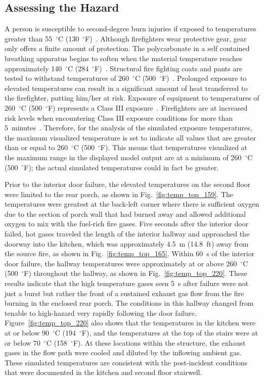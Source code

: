 \subsection{Assessing the Hazard}
\label{hazard}
A person is susceptible to second-degree burn injuries if exposed to temperatures greater than 55~$^{\circ}$C (130~$^{\circ}$F)~\cite{contactburn}. Although firefighters wear protective gear, gear only offers a finite amount of protection. The polycarbonate in a self contained breathing apparatus begins to soften when the material temperature reaches approximately 140~$^{\circ}$C (284~$^{\circ}$F)~\cite{mensch2011emergency}. Structural fire fighting coats and pants are tested to withstand temperatures of 260~$^{\circ}$C (500~$^{\circ}$F)~\cite{nfpa2013standard}. Prolonged exposure to elevated temperatures can result in a significant amount of heat transferred to the firefighter, putting him/her at risk. Exposure of equipment to temperatures of 260~$^{\circ}$C (500~$^{\circ}$F) represents a Class III exposure~\cite{Donnelly2006}. Firefighters are at increased risk levels when encountering Class III exposure conditions for more than 5~minutes~\cite{Donnelly2006}. Therefore, for the analysis of the simulated exposure temperatures, the maximum visualized temperature is set to indicate all values that are greater than or equal to 260~$^{\circ}$C (500~$^{\circ}$F). This means that temperatures visualized at the maximum range in the displayed model output are at a minimum of 260~$^{\circ}$C (500~$^{\circ}$F); the actual simulated temperatures could in fact be greater. 

Prior to the interior door failure, the elevated temperatures on the second floor were limited to the rear porch, as shown in Fig.~\ref{fig:temp_top_159}. The temperatures were greatest at the back-left corner where there is sufficient oxygen due to the section of porch wall that had burned away and allowed additional oxygen to mix with the fuel-rich fire gases. Five seconds after the interior door failed, hot gases traveled the length of the interior hallway and approached the doorway into the kitchen, which was approximately 4.5~m (14.8~ft) away from the source fire, as shown in Fig.~\ref{fig:temp_top_165}. Within 60~s of the interior door failure, the hallway temperatures were approximately at or above 260~$^{\circ}$C (500~$^{\circ}$F) throughout the hallway, as shown in Fig.~\ref{fig:temp_top_220}. These results indicate that the high temperature gases seen 5~s after failure were not just a burst but rather the front of a sustained exhaust gas flow from the fire burning in the enclosed rear porch. The conditions in this hallway changed from tenable to high-hazard very rapidly following the door failure. Figure~\ref{fig:temp_top_220} also shows that the temperatures in the kitchen were at or below 90~$^{\circ}$C (194~$^{\circ}$F), and the temperatures at the top of the stairs were at or below 70~$^{\circ}$C (158~$^{\circ}$F). At these locations within the structure, the exhaust gases in the flow path were cooled and diluted by the inflowing ambient gas. These simulated temperatures are consistent with the post-incident conditions that were documented in the kitchen and second floor stairwell.

